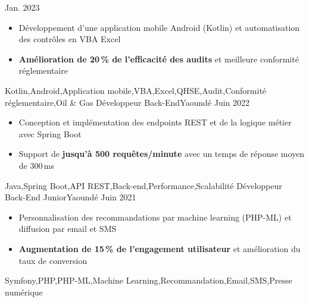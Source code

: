 \begin{experiences}
    {Jan. 2023} {
                      \begin{itemize}
                        \item Développement d'une application mobile Android (Kotlin) et automatisation des contrôles en VBA Excel
                        \item \textbf{Amélioration de 20\,\% de l'efficacité des audits} et meilleure conformité réglementaire
                      \end{itemize}
                    }
                    {Kotlin,Android,Application mobile,VBA,Excel,QHSE,Audit,Conformité réglementaire,Oil \& Gas}
  \emptySeparator
     {Développeur Back-End}{}{Yaoundé}
    {Juin 2022} {
                      \begin{itemize}
                        \item Conception et implémentation des endpoints REST et de la logique métier avec Spring Boot
                        \item Support de \textbf{jusqu'à 500 requêtes/minute} avec un temps de réponse moyen de 300\,ms
                      \end{itemize}
                    }
                    {Java,Spring Boot,API REST,Back-end,Performance,Scalabilité}
  \emptySeparator
     {Développeur Back-End Junior}{}{Yaoundé}
    {Juin 2021} {
                      \begin{itemize}
                        \item Personnalisation des recommandations par machine learning (PHP-ML) et diffusion par email et SMS
                        \item \textbf{Augmentation de 15\,\% de l'engagement utilisateur} et amélioration du taux de conversion
                      \end{itemize}
                    }
                    {Symfony,PHP,PHP-ML,Machine Learning,Recommandation,Email,SMS,Presse numérique}
\end{experiences}